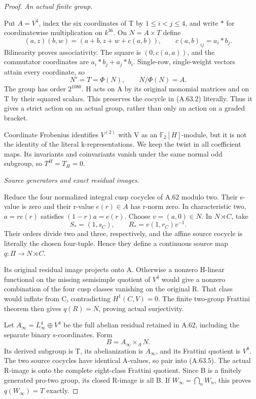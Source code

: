 \begin{proof}
\emph{An actual finite group.}\par
Put \(A=V^4\), index the six coordinates of T by
\(1\leq i<j\leq4\), and write \(*\) for coordinatewise
multiplication on \(k^{36}\). On \(N=A\times T\) define
\[
 (a,z)(b,w)=(a+b,z+w+c(a,b)),
 \qquad c(a,b)_{ij}=a_i*b_j.
 \tag{A.63.2}
\]
Bilinearity proves associativity. The square is
\((0,c(a,a))\), and the commutator coordinates are
\(a_i*b_j+a_j*b_i\). Single-row, single-weight vectors
attain every coordinate, so
\[
 N'=T=\Phi(N),\qquad N/\Phi(N)=A.
 \tag{A.63.3}
\]
The group has order \(2^{1080}\). H acts on A by its
original monomial matrices and on T by their squared
scalars. This preserves the cocycle in (A.63.2) literally.
Thus it gives a strict action on an actual group, rather
than only an action on a graded bracket.

Coordinate Frobenius identifies \(V^{(2)}\) with V as
an \(\mathbb F_2[H]\)-module, but it is not the identity
of the literal k-representations. We keep the twist in
all coefficient maps. Its invariants and coinvariants
vanish under the same normal odd subgroup, so
\(T^H=T_H=0\).

\emph{Source generators and exact residual images.}\par
Reduce the four normalized integral cusp cocycles of
A.62 modulo two. Their s-value is zero and their r-value
\(e(r)\in A\) has r-norm zero. In characteristic two,
\(a=r e(r)\) satisfies \((1-r)a=e(r)\). Choose
\(v=(a,0)\in N\). In \(N\rtimes C\), take
\[
 S_*=(1,s_C),\qquad R_*=v(1,r_C)v^{-1}.
 \tag{A.63.4}
\]
Their orders divide two and three, respectively, and
the affine source cocycle is literally the chosen
four-tuple. Hence they define a continuous source map
\(q:\Pi\to N\rtimes C\).

Its original residual image projects onto A. Otherwise
a nonzero H-linear functional on the missing semisimple
quotient of \(V^4\) would give a nonzero combination of
the four cusp classes vanishing on the original R.
That class would inflate from C, contradicting
\(H^1(C,V)=0\). The finite two-group Frattini theorem
then gives \(q(R)=N\), proving actual surjectivity.

Let \(A_\infty=L_\infty^4\oplus V^4\) be the full
abelian residual retained in A.62, including the
separate binary s-coordinates. Form
\[
 B=A_\infty\mathbin{\times}_A N.
 \tag{A.63.5}
\]
Its derived subgroup is T, its abelianization is
\(A_\infty\), and its Frattini quotient is \(V^8\).
The two source cocycles have identical A-values,
so pair into (A.63.5). The actual R-image is onto
the complete eight-class Frattini quotient. Since
B is a finitely generated pro-two group, its closed
R-image is all B. If \(W_\infty=\bigcap_nW_n\), this
proves \(q(W_\infty)=T\) exactly.


\end{proof}
